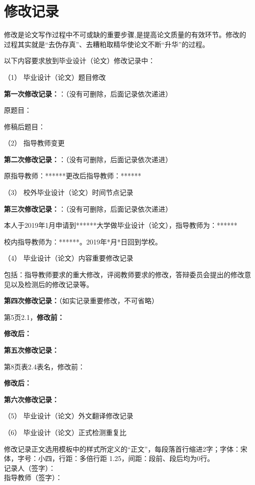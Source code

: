 
\chapter*{\hfill 修改记录 \hfill}
\linespread{1.25}
修改是论文写作过程中不可或缺的重要步骤,是提高论文质量的有效环节。修改的过程其实就是“去伪存真”、去糟粕取精华使论文不断“升华”的过程。

以下内容要求放到毕业设计（论文）修改记录中：

（1） 毕业设计（论文）题目修改

{\textbf {第一次修改记录：}}：（没有可删除，后面记录依次递进）

原题目：

修稿后题目：

（2） 指导教师变更

{\textbf {第二次修改记录：}}：（没有可删除，后面记录依次递进）

原指导教师：******更改后指导教师：******

（3） 校外毕业设计（论文）时间节点记录

{\textbf {第三次修改记录：}}：（没有可删除，后面记录依次递进）

本人于2019年1月申请到******大学做毕业设计（论文），指导教师为：******

校内指导教师为：******。2019年*月*日回到学校。

（4） 毕业设计（论文）内容重要修改记录

包括：指导教师要求的重大修改，评阅教师要求的修改，答辩委员会提出的修改意见以及检测后的修改记录等。

{\textbf {第四次修改记录：}}（如实记录重要修改，不可省略）

第5页2.1，{\textbf{修改前：}}

{\textbf{修改后：}}

{\textbf {第五次修改记录：}}

第8页表2.4表名，修改前：

{\textbf{修改后：}}

{\textbf {第六次修改记录：}}

（5） 毕业设计（论文）外文翻译修改记录

（6） 毕业设计（论文）正式检测重复比

修改记录正文选用模板中的样式所定义的“正文”，每段落首行缩进2字；字体：宋体，字号：小四，行距：多倍行距 1.25，间距：段前、段后均为0行。\\
\hspace*{8.5cm}记录人（签字）：\\
\hspace*{8cm}指导教师（签字）：